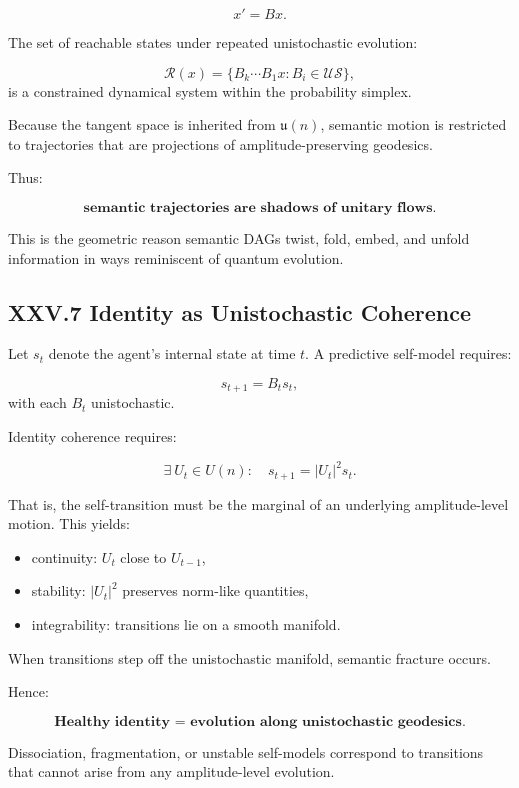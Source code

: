 \documentclass[11pt,letterpaper]{article}
\begin{document}
\[
x' = Bx.
\]

The set of reachable states under repeated unistochastic evolution:

\[
\mathcal{R}(x) = \{ B_k \cdots B_1 x : B_i \in \mathcal{U\!S} \},
\]
is a constrained dynamical system within the probability simplex.

Because the tangent space is inherited from $\mathfrak{u}(n)$, semantic motion is restricted to trajectories that are projections of amplitude-preserving geodesics.

Thus:

\[
\textbf{semantic trajectories are shadows of unitary flows}.
\]

This is the geometric reason semantic DAGs twist, fold, embed, and unfold information in ways reminiscent of quantum evolution.

\subsection{XXV.7 Identity as Unistochastic Coherence}

Let $s_t$ denote the agent’s internal state at time $t$. A predictive self-model requires:

\[
s_{t+1} = B_t s_t,
\]
with each $B_t$ unistochastic.

Identity coherence requires:

\[
\exists \ U_t \in U(n): \quad s_{t+1} = |U_t|^2 s_t.
\]

That is, the self-transition must be the marginal of an underlying amplitude-level motion. This yields:

\begin{itemize}
    \item continuity: $U_t$ close to $U_{t-1}$,
    \item stability: $|U_t|^2$ preserves norm-like quantities,
    \item integrability: transitions lie on a smooth manifold.
\end{itemize}

When transitions step off the unistochastic manifold, semantic fracture occurs.

Hence:

\[
\textbf{Healthy identity = evolution along unistochastic geodesics.}
\]

Dissociation, fragmentation, or unstable self-models correspond to transitions that cannot arise from any amplitude-level evolution.
\end{document}
